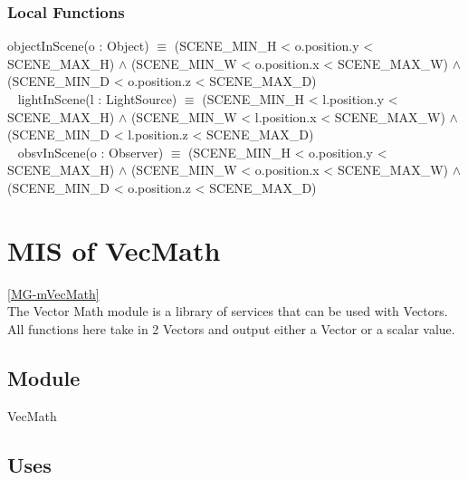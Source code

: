 \documentclass[12pt, titlepage]{article}
\begin{document}
\subsubsection{Local Functions}
objectInScene(o : Object) $\equiv$ (SCENE\_MIN\_H < o.position.y < 
SCENE\_MAX\_H) 
$\land$ (SCENE\_MIN\_W < o.position.x < SCENE\_MAX\_W) $\land$ 
(SCENE\_MIN\_D < o.position.z < SCENE\_MAX\_D) \\
~\newline
lightInScene(l : LightSource) $\equiv$ (SCENE\_MIN\_H < l.position.y < 
SCENE\_MAX\_H) 
$\land$ (SCENE\_MIN\_W < l.position.x < SCENE\_MAX\_W) $\land$ 
(SCENE\_MIN\_D < l.position.z < SCENE\_MAX\_D)\\
~\newline
obsvInScene(o : Observer) $\equiv$ (SCENE\_MIN\_H < o.position.y < 
SCENE\_MAX\_H) 
$\land$ (SCENE\_MIN\_W < o.position.x < SCENE\_MAX\_W) $\land$ 
(SCENE\_MIN\_D < o.position.z < SCENE\_MAX\_D) \\


\newpage

\section{MIS of VecMath} \ref{MG-mVecMath} \\
The Vector Math module is a library of services that can be used with Vectors. 
All functions here take in 2 Vectors and output either a Vector or a scalar 
value. 

\subsection{Module}
VecMath

\subsection{Uses}
\end{document}
